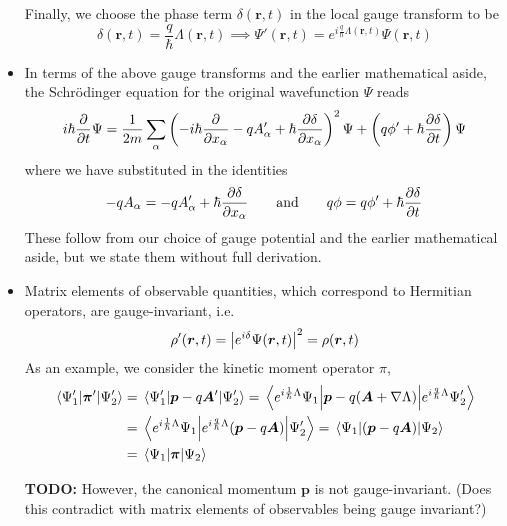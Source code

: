 \documentclass[11pt, a4paper]{article}
\renewcommand{\grad}{\nabla}
\newcommand{\eqtext}[1]{\qquad \text{#1} \qquad}
\newcommand{\Schro}{Schr\"{o}dinger\xspace}
\newcommand{\Herm}{Hermitian\xspace}
\renewcommand{\vec}[1]{\bm{#1}}  %
\renewcommand{\r}{\vec{r}}  %
\newcommand{\A}{\vec{A}}  %
\newcommand{\p}{\psi}  %
\renewcommand{\P}{\Psi}  %
\begin{document}
\begin{itemize}
	Finally, we choose the phase term $ \delta(\r, t) $ in the local gauge transform to be
	\begin{equation*}
		\delta(\r, t) = \frac{q}{\hbar}\Lambda(\r, t) \implies \P'(\r, t) = e^{i\frac{q}{\hbar}\Lambda(\r, t)} \P(\r, t)
	\end{equation*}
	
	\item In terms of the above gauge transforms and the earlier mathematical aside, the \Schro equation for the original wavefunction $ \P $ reads
	\begin{equation*}
		i\hbar \pdv{t}\P = \frac{1}{2m}\sum_{\alpha}\left(-i\hbar \pdv{x_{\alpha}} - q A'_{\alpha} + \hbar \pdv{\delta}{x_{\alpha}}\right)^{2} \P + \left(q\phi' + \hbar \pdv{\delta}{t}\right)\P
	\end{equation*}
	where we have substituted in the identities
	\begin{equation*}
		-qA_{\alpha} = -qA'_{\alpha} + \hbar \pdv{\delta}{x_{\alpha}} \eqtext{and} q\phi = q\phi' + \hbar \pdv{\delta}{t} 
	\end{equation*}
	These follow from our choice of gauge potential and the earlier mathematical aside, but we state them without full derivation.
	
	\item Matrix elements of observable quantities, which correspond to \Herm operators, are gauge-invariant, i.e.
	\begin{equation*}
		\rho'(\r, t) = \abs{e^{i\delta}\P(\r, t)}^{2} = \rho(\r, t)
	\end{equation*}
	As an example, we consider the kinetic moment operator $ \pi $,
	\begin{align*}
		\mel{\P_{1}'}{\vec{\pi}'}{\P_{2}'} & = \mel{\P_{1}'}{\vec{p} - q\A'}{\P_{2}'} = \mel{e^{i\frac{1}{\hbar}\Lambda}\P_{1}}{\vec{p} - q(\A + \grad \Lambda)}{e^{i\frac{q}{\hbar}\Lambda}\P_{2}'}\\
		& =  \mel{e^{i\frac{1}{\hbar}\Lambda}\P_{1}}{e^{i\frac{q}{\hbar}\Lambda}(\vec{p} - q \A)}{\P_{2}'} = \mel{\P_{1}}{(\vec{p} - q\A)}{\P_{2}}\\
		& = \mel{\P_{1}}{\vec{\pi}}{\P_{2}}
	\end{align*}
	
	\textbf{TODO:} However, the canonical momentum $ \vec{p} $ is not gauge-invariant. (Does this contradict with matrix elements of observables being gauge invariant?)
	
	\iffalse
	As a result of $ \vec{\pi} $ being gauge invariant instead of $ \vec{\p} $, in an electromagnetic field we modify the definitino of probability current to
	\begin{equation*}
		\vec{j}(\r, t) = \frac{1}{m} \Re \big[\P^{*}(\r, t)\vec{\pi}\P(\r, t)\big]
	\end{equation*}
	\fi 
	
\end{itemize}
\end{document}
